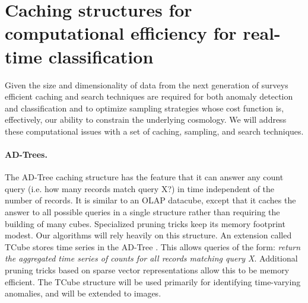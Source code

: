 \documentclass[prd,nofootbib,floatfix,11pt,tightenlines,nofootinbib]{revtex4}
\begin{document}
%

\section{Caching structures for computational efficiency for
  real-time classification}
\label{sec:computationalefficiency}

Given the size and dimensionality of data from the next generation of
surveys efficient caching and search techniques are required for both
anomaly detection and classification and to optimize sampling
strategies whose cost function is, effectively, our ability to
constrain the underlying cosmology. We will address these
computational issues with a set of caching, sampling, and search
techniques.

\paragraph{AD-Trees.}
The AD-Tree \cite{Moore97a} caching structure has the feature that it can
answer any count query (i.e. how many records match query X?) in time
independent of the number of records.  It is similar to an OLAP datacube,
except that it caches the answer to all possible queries in a single
structure rather than requiring the building of many cubes.  Specialized
pruning tricks keep its memory footprint modest.  Our algorithms will rely
heavily on this structure. An extension called TCube stores time series in the AD-Tree
\cite{Sabhnani06}.  This allows queries of the form: {\it return the
 aggregated time series of counts for all records matching query X}.
Additional pruning tricks based on sparse vector representations allow this
to be memory efficient.  The TCube structure will be used primarily for
identifying time-varying anomalies, and will be extended to images.
\end{document}
